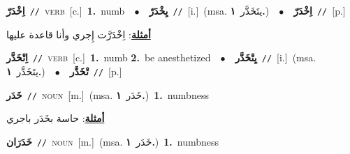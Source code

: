 \documentclass[10pt,a4paper,twoside]{article} %
\begin{document}
\begin{multicols}{2}
{{{{{{{{\setlength\topsep{0pt}\textbf{\foreignlanguage{arabic}{اِخْدَرّ}}\ {\color{gray}\texttt{//}\color{black}}\ \textsc{verb}\ [c.]\ \textbf{1.}~numb\ \ $\bullet$\ \ \setlength\topsep{0pt}\textbf{\foreignlanguage{arabic}{يِخْدَرّ}}\ {\color{gray}\texttt{//}\color{black}}\ [i.]\ \color{gray}(msa. \foreignlanguage{arabic}{يتَخَدَّر}~\foreignlanguage{arabic}{\textbf{١.}})\color{black}\ \ $\bullet$\ \ \setlength\topsep{0pt}\textbf{\foreignlanguage{arabic}{اِخْدَرّ}}\ {\color{gray}\texttt{//}\color{black}}\ [p.]\  \begin{flushright}\color{gray}\foreignlanguage{arabic}{\textbf{\underline{\foreignlanguage{arabic}{أمثلة}}}: اِخْدَرَّت إِجري وأنا قاعدة عليها}\end{flushright}\color{black}} \vspace{2mm}

{\setlength\topsep{0pt}\textbf{\foreignlanguage{arabic}{اِتْخَدَّر}}\ {\color{gray}\texttt{//}\color{black}}\ \textsc{verb}\ [c.]\ \textbf{1.}~numb  \textbf{2.}~be anesthetized\ \ $\bullet$\ \ \setlength\topsep{0pt}\textbf{\foreignlanguage{arabic}{يِتْخَدَّر}}\ {\color{gray}\texttt{//}\color{black}}\ [i.]\ \color{gray}(msa. \foreignlanguage{arabic}{يتَخَدَّر}~\foreignlanguage{arabic}{\textbf{١.}})\color{black}\ \ $\bullet$\ \ \setlength\topsep{0pt}\textbf{\foreignlanguage{arabic}{تْخَدَّر}}\ {\color{gray}\texttt{//}\color{black}}\ [p.]\ 

{\setlength\topsep{0pt}\textbf{\foreignlanguage{arabic}{خَدَر}}\ {\color{gray}\texttt{//}\color{black}}\ \textsc{noun}\ [m.]\ \color{gray}(msa. \foreignlanguage{arabic}{خَدَر}~\foreignlanguage{arabic}{\textbf{١.}})\color{black}\ \textbf{1.}~numbness\  \begin{flushright}\color{gray}\foreignlanguage{arabic}{\textbf{\underline{\foreignlanguage{arabic}{أمثلة}}}: حاسة بخَدَر باجري}\end{flushright}\color{black}} \vspace{2mm}

{\setlength\topsep{0pt}\textbf{\foreignlanguage{arabic}{خَدَرَان}}\ {\color{gray}\texttt{//}\color{black}}\ \textsc{noun}\ [m.]\ \color{gray}(msa. \foreignlanguage{arabic}{خَدَر}~\foreignlanguage{arabic}{\textbf{١.}})\color{black}\ \textbf{1.}~numbness\ 

}}}}}}}}}
\end{multicols}
\end{document}

